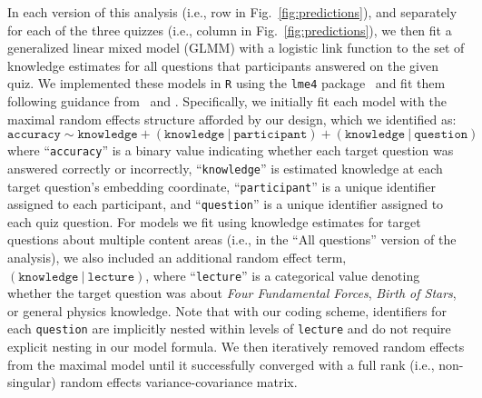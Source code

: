 \documentclass[10pt]{article}
\begin{document}
In each version of this analysis (i.e., row in Fig.~\ref{fig:predictions}), and
separately for each of the three quizzes (i.e., column in
Fig.~\ref{fig:predictions}), we then fit a generalized linear mixed model
(GLMM) with a logistic link function to the set of knowledge estimates for all
questions that participants answered on the given quiz. We implemented these
models in \texttt{R} using the \texttt{lme4} package~\citep{BateEtal15a} and
fit them following guidance from~\citet{BateEtal15b} and \citet{MatuEtal17}.
Specifically, we initially fit each model with the maximal random effects
structure afforded by our design, which we identified as:
\[
    \mathtt{accuracy \sim knowledge + (knowledge\ \vert\ participant) + (knowledge\ \vert\ question)}
\]
where ``\texttt{accuracy}'' is a binary value indicating whether each target
question was answered correctly or incorrectly, ``\texttt{knowledge}'' is
estimated knowledge at each target question's embedding coordinate,
``\texttt{participant}'' is a unique identifier assigned to each participant,
and ``\texttt{question}'' is a unique identifier assigned to each quiz
question. For models we fit using knowledge estimates for target questions
about multiple content areas (i.e., in the ``All questions'' version of the
analysis), we also included an additional random effect term,
$\mathtt{(knowledge\ \vert\ lecture)}$, where ``\texttt{lecture}'' is a
categorical value denoting whether the target question was about \textit{Four
Fundamental Forces}, \textit{Birth of Stars}, or general physics knowledge.
Note that with our coding scheme, identifiers for each \texttt{question} are
implicitly nested within levels of \texttt{lecture} and do not require explicit
nesting in our model formula. We then iteratively removed random effects from 
the maximal model until it successfully converged with a full rank (i.e., non-singular) 
random effects variance-covariance matrix.
\end{document}

